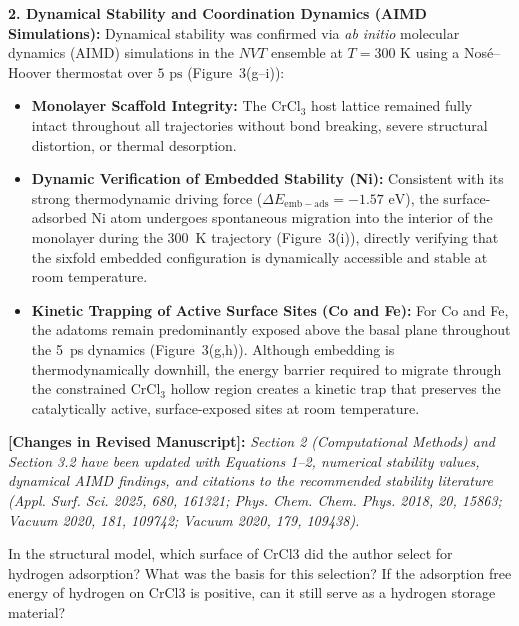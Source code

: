 \documentclass[11pt, sans, a4paper]{moderncv}
\newcommand{\manuscriptchange}[1]{\vspace{0.3em}\noindent\textbf{\color{acsblue}[Changes in Revised Manuscript]:} \textit{#1}\vspace{0.4em}}
\begin{document}
\noindent\textbf{2. Dynamical Stability and Coordination Dynamics (AIMD Simulations):}
Dynamical stability was confirmed via \textit{ab initio} molecular dynamics (AIMD) simulations in the $NVT$ ensemble at $T = 300\text{ K}$ using a Nosé--Hoover thermostat over $5\text{ ps}$ (Figure~3(g--i)):
\begin{itemize}[leftmargin=1.5em, itemsep=0.2em]
\item \textbf{Monolayer Scaffold Integrity:} The $\text{CrCl}_3$ host lattice remained fully intact throughout all trajectories without bond breaking, severe structural distortion, or thermal desorption.
\item \textbf{Dynamic Verification of Embedded Stability (Ni):} Consistent with its strong thermodynamic driving force ($\Delta E_{\mathrm{emb-ads}} = -1.57\text{ eV}$), the surface-adsorbed Ni atom undergoes spontaneous migration into the interior of the monolayer during the 300~K trajectory (Figure~3(i)), directly verifying that the sixfold embedded configuration is dynamically accessible and stable at room temperature.
\item \textbf{Kinetic Trapping of Active Surface Sites (Co and Fe):} For Co and Fe, the adatoms remain predominantly exposed above the basal plane throughout the 5~ps dynamics (Figure~3(g,h)). Although embedding is thermodynamically downhill, the energy barrier required to migrate through the constrained CrCl$_3$ hollow region creates a kinetic trap that preserves the catalytically active, surface-exposed sites at room temperature.
\end{itemize}

\manuscriptchange{Section 2 (Computational Methods) and Section 3.2 have been updated with Equations 1--2, numerical stability values, dynamical AIMD findings, and citations to the recommended stability literature (Appl. Surf. Sci. 2025, 680, 161321; Phys. Chem. Chem. Phys. 2018, 20, 15863; Vacuum 2020, 181, 109742; Vacuum 2020, 179, 109438).}

\begin{reviewercomment}
In the structural model, which surface of CrCl3 did the author select for hydrogen adsorption? What was the basis for this selection? If the adsorption free energy of hydrogen on CrCl3 is positive, can it still serve as a hydrogen storage material?
\end{reviewercomment}
\end{document}
